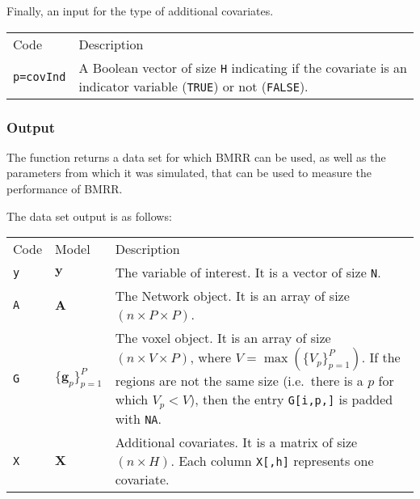 \documentclass[
]{article}
\begin{document}
Finally, an input for the type of additional covariates.

\begin{longtable}[]{@{}
  >{\raggedleft\arraybackslash}p{}
  >{\raggedright\arraybackslash}p{}@{}}
\toprule\noalign{}
\endhead
\bottomrule\noalign{}
\endlastfoot
Code & Description \\
\texttt{p=covInd} & A Boolean vector of size \texttt{H} indicating if the covariate is an
indicator variable (\texttt{TRUE}) or not (\texttt{FALSE}). \\
\end{longtable}

\subsubsection{Output}\label{output-3}

The function returns a data set for which BMRR can be used, as well as the
parameters from which it was simulated, that can be used to measure the
performance of BMRR.

The data set output is as follows:

\begin{longtable}[]{@{}
  >{\raggedleft\arraybackslash}p{}
  >{\centering\arraybackslash}p{}
  >{\raggedright\arraybackslash}p{}@{}}
\toprule\noalign{}
\endhead
\bottomrule\noalign{}
\endlastfoot
Code & Model & Description \\
\texttt{y} & \( {\boldsymbol y} \) & The variable of interest. It is a vector of size \texttt{N}. \\
\texttt{A} & \( {\boldsymbol A} \) & The Network object. It is an array of
size \((n \times P \times P)\). \\
\texttt{G} & \(\{ {\boldsymbol g} _p\}_{p=1}^P\) & The voxel object. It is an array
of size \((n \times V \times P)\), where \(V= \max(\{V_p\}_{p=1}^P)\).
If the regions are not the same size (i.e.~there is a \(p\) for
which \(V_p < V\)), then the entry \texttt{G{[}i,p,{]}} is padded with \texttt{NA}. \\
\texttt{X} & \( {\boldsymbol X} \) & Additional covariates. It is
a matrix of size \((n \times H)\). Each column \texttt{X{[},h{]}} represents one
covariate. \\
\end{longtable}
\end{document}
